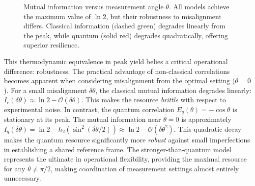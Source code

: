 \documentclass[%
  reprint,
  showpacs,
  showkeys,
  prl,
  floatfix
]{revtex4-2}
\begin{document}
\begin{figure}[ht!]
    \caption{Mutual information versus measurement angle $\theta$. All models achieve the maximum value of $\ln 2$, but their robustness to misalignment differs. Classical information (dashed green) degrades linearly from the peak, while quantum (solid red) degrades quadratically, offering superior resilience.}
    \label{fig:mutual_information}
\end{figure}

This thermodynamic equivalence in peak yield belies a critical operational difference: robustness. The practical advantage of non-classical correlations becomes apparent when considering misalignment from the optimal setting ($\theta=0$).
For a small misalignment $\delta\theta$, the classical mutual information degrades linearly: $I_c(\delta\theta) \approx \ln 2 - \mathcal{O}(\delta\theta)$. This makes the resource \emph{brittle} with respect to experimental noise.
In contrast, the quantum correlation $E_q(\theta)=-\cos\theta$ is stationary at its peak. The mutual information near $\theta=0$ is approximately $I_q(\delta\theta) = \ln 2 - h_2(\sin^2(\delta\theta/2)) \approx \ln 2 - \mathcal{O}(\delta\theta^2)$. This quadratic decay makes the quantum resource significantly more \emph{robust} against small imperfections in establishing a shared reference frame.
The stronger-than-quantum model represents the ultimate in operational flexibility, providing the maximal resource for any $\theta \neq \pi/2$, making coordination of measurement settings almost entirely unnecessary.
\end{document}
